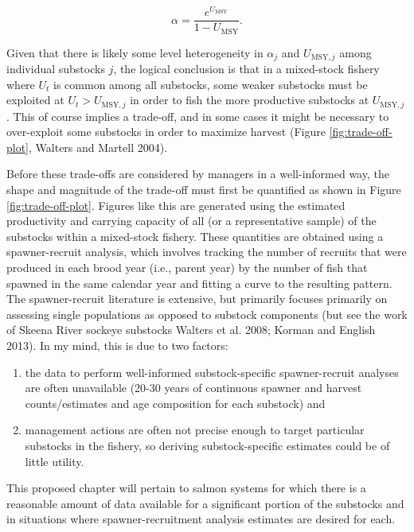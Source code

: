 \documentclass[12pt,]{book}
\theoremstyle{definition}
\theoremstyle{definition}
\theoremstyle{definition}
\theoremstyle{remark}
\begin{document}
\begin{equation}
  \alpha=\frac{e^{U_{\text{MSY}}}}{1 - U_{\text{MSY}}}.
  \label{eq:umsy-to-alpha}
\end{equation}

Given that there is likely some level heterogeneity in \(\alpha_j\) and
\(U_{\text{MSY},j}\) among individual substocks \(j\), the logical
conclusion is that in a mixed-stock fishery where \(U_t\) is common
among all substocks, some weaker substocks must be exploited at
\(U_t > U_{\text{MSY},j}\) in order to fish the more productive
substocks at \(U_{\text{MSY},j}\). This of course implies a trade-off,
and in some cases it might be necessary to over-exploit some substocks
in order to maximize harvest (Figure \ref{fig:trade-off-plot}, Walters
and Martell 2004).

Before these trade-offs are considered by managers in a well-informed
way, the shape and magnitude of the trade-off must first be quantified
as shown in Figure \ref{fig:trade-off-plot}. Figures like this are
generated using the estimated productivity and carrying capacity of all
(or a representative sample) of the substocks within a mixed-stock
fishery. These quantities are obtained using a spawner-recruit analysis,
which involves tracking the number of recruits that were produced in
each brood year (i.e., parent year) by the number of fish that spawned
in the same calendar year and fitting a curve to the resulting pattern.
The spawner-recruit literature is extensive, but primarily focuses
primarily on assessing single populations as opposed to substock
components (but see the work of Skeena River sockeye substocks Walters
et al. 2008; Korman and English 2013). In my mind, this is due to two
factors:

\begin{enumerate}
\def\labelenumi{(\arabic{enumi})}
\item
  the data to perform well-informed substock-specific spawner-recruit
  analyses are often unavailable (20-30 years of continuous spawner and
  harvest counts/estimates and age composition for each substock) and
\item
  management actions are often not precise enough to target particular
  substocks in the fishery, so deriving substock-specific estimates
  could be of little utility.
\end{enumerate}

\noindent
This proposed chapter will pertain to salmon systems for which there is
a reasonable amount of data available for a significant portion of the
substocks and in situations where spawner-recruitment analysis estimates
are desired for each.
\end{document}
